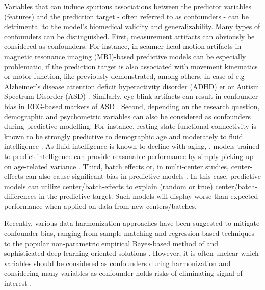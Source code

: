 \documentclass{article}
\begin{document}
Variables that can induce spurious associations between the predictor variables (features) and the prediction target - often referred to as confounders - can be detrimental to the model's biomedical validity and generalizability. Many types of confounders can be distinguished.
First, measurement artifacts can obviously be considered as confounders. For instance, in-scanner head motion artifacts in magnetic resonance imaging (MRI)-based predictive models can be especially problematic, if the prediction target is also associated with movement kinematics or motor function, like previously demonstrated, among others, in case of e.g Alzheimer's disease \citep{rao2017predictive} attention deficit hyperactivity disorder (ADHD) \citep{couvy2016head, eloyan2012automated}er or Autism Spectrum Disorder (ASD) \citep{spisak2014voxel, spisak2019optimal, gotts2013perils}. Similarly, eye-blink artifacts can result in confounder-bias in EEG-based markers of ASD  \citep{eldridge2014robust}.
Second, depending on the research question, demographic and psychometric variables can also be considered as confounders during predictive modelling. For instance, resting-state functional connectivity is known to be strongly predictive to  demographic age \citep{wang2012decoding, dukart2011age} and moderately to fluid intelligence \citep{he2020deep, cole2012global}. As fluid intelligence is known to decline with aging, \citep{kievit2018neural}, models trained to predict intelligence can provide reasonable performance by simply picking up on age-related variance \citep{lohmann2021predicting, dubois2018distributed}. 
Third, batch effects or, in multi-center studies, center-effects can also cause significant bias in predictive models \citep{leek2010tackling, da2020performance}. In this case, predictive models can utilize center/batch-effects to explain (random or true) center/batch-differences in the predictive target. Such models will display worse-than-expected performance when applied on data from new centers/batches.

Recently, various data harmonization approaches have been suggested to mitigate confounder-bias, ranging from sample matching \citep{rao2017predictive} and regression-based techniques \citep{rao2017predictive, dukart2011age, spisak2014voxel, abdulkadir2014reduction} to the popular non-parametric empirical Bayes-based method of \cite{johnson2007adjusting} and sophisticated deep-learning oriented solutions \citep{zhao2020training, hognon2019standardization}. However, it is often unclear which variables should be considered as confounders during harmonization and considering many variables as confounder holds risks of eliminating signal-of-interest \citep{wachinger2021detect}.
\end{document}
